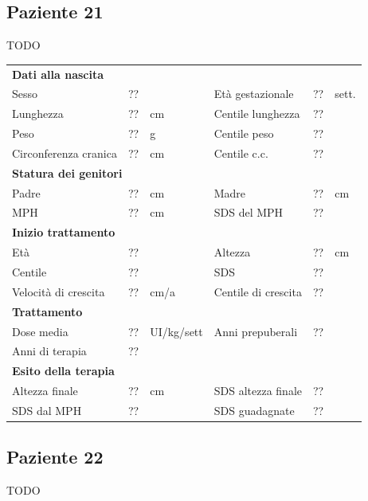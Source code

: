 \subsection*{Paziente 21}

TODO

\begin{table}[!h]
\begin{tabular}{lrllrl}
\toprule
\multicolumn{6}{l}{\textbf{Dati alla nascita}}\\
Sesso 		& \multicolumn{2}{l}{??} 	& Età gestazionale 		& ?? 		& sett.\\
Lunghezza 	& ?? 		& cm 				& Centile lunghezza		& ?? 		\\
Peso 		& ?? 		& g					& Centile peso			& ?? 		\\
Circonferenza cranica	& ?? 		& cm 	& Centile c.c.			& ?? \\
\midrule
\multicolumn{6}{l}{\textbf{Statura dei genitori}}\\
Padre 		& ?? & cm 	& Madre 				& ?? & cm \\
MPH 		& ?? & cm 	& SDS del MPH 			& ??\\
\midrule
\multicolumn{6}{l}{\textbf{Inizio trattamento}} \\
Età	& ?? & 		& Altezza 				& ?? & cm  \\
Centile & ?? 	 &		& SDS		& ?? \\
Velocità di crescita & ?? & cm/a	& Centile di crescita & ??\\
\midrule
\multicolumn{6}{l}{\textbf{Trattamento}} \\
Dose media		& ?? & UI/kg/sett & Anni prepuberali & ??\\
Anni di terapia & ??\\
\midrule
\multicolumn{6}{l}{\textbf{Esito della terapia}} \\
Altezza finale			& ?? & cm 	& SDS altezza finale		& ??\\
SDS dal MPH				& ?? &		& SDS guadagnate 			& ??\\
\bottomrule
\end{tabular}
\end{table}
\clearpage


\subsection*{Paziente 22}

TODO

